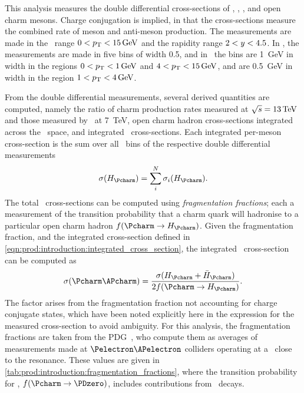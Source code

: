 This analysis measures the double differential cross-sections of \PDzero, \PDp, 
\PDsplus, and \PDstarp open charm mesons.
Charge conjugation is implied, in that the cross-sections measure the combined 
rate of meson and anti-meson production.
The measurements are made in the \pT\ range $0 < \pT < \SI{15}{\GeV}$ and the 
rapidity range $2 < y < 4.5$.
In \rapidity, the measurements are made in five bins of width 0.5, and in \pT\ 
the bins are \SI{1}{\GeV} in width in the regions $0 < \pT < \SI{1}{\GeV}$ and 
$4 < \pT < \SI{15}{\GeV}$, and are \SI{0.5}{\GeV} in width in the region $1 < 
\pT < \SI{4}{\GeV}$.

From the double differential measurements, several derived quantities are 
computed, namely the ratio of charm production rates measured at $\sqrts = 
\SI{13}{\TeV}$ and those measured by \lhcb\ at \SI{7}{\TeV}, open charm hadron 
cross-sections integrated across the \pTy\ space, and integrated \ccbar\ 
cross-sections.
Each integrated per-meson cross-section is the sum over all \pTy\ bins of the 
respective double differential measurements
\begin{equation}
  \xsec{(\PHc)} =
    \sum_{i}^{N} \xsec_{i}(\PHc).
  \label{eqn:prod:introduction:integrated_cross_section}
\end{equation}
The total \ccbar\ cross-sections can be computed using \emph{fragmentation 
  fractions}; each a measurement of the transition probability that a charm 
quark will hadronise to a particular open charm hadron $f(\cToHc)$.
Given the fragmentation fraction, and the integrated cross-section defined in 
\cref{eqn:prod:introduction:integrated_cross_section}, the integrated \ccbar\ 
cross-section can be computed as
\begin{equation}
  \xsec{(\ccbar)} = \frac{\xsec(\PHc + \APHc)}{2f(\cToHc)}.
  \label{eqn:prod:introduction:ccbar_cross_section}
\end{equation}
The factor \sfrac{1}{2} arises from the fragmentation fraction not accounting 
for charge conjugate states, which have been noted explicitly here in the 
expression for the measured cross-section to avoid ambiguity.
For this analysis, the fragmentation fractions are taken from the 
\ac{PDG}~\cite{PDG2008}, who compute them as averages of measurements made at 
$\Pelectron\APelectron$ colliders operating at a \sqrts\ close to the 
\PUpsilonFourS resonance.
These values are given in \cref{tab:prod:introduction:fragmentation_fractions}, 
where the transition probability for \PDzero, $f(\decay{\Pcharm}{\PDzero})$, 
includes contributions from \DstToDzpi\ decays.


